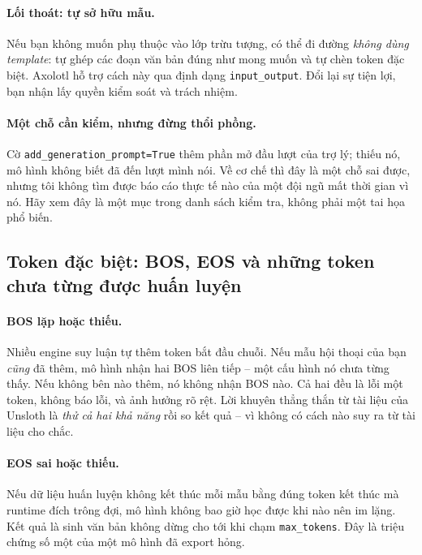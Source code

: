 \paragraph{Lối thoát: tự sở hữu mẫu.} Nếu bạn không muốn phụ thuộc vào lớp trừu tượng, có thể đi đường \emph{không dùng template}: tự ghép các đoạn văn bản đúng như mong muốn và tự chèn token đặc biệt. Axolotl hỗ trợ cách này qua định dạng \texttt{input\_output}. Đổi lại sự tiện lợi, bạn nhận lấy quyền kiểm soát và trách nhiệm.

\paragraph{Một chỗ cần kiểm, nhưng đừng thổi phồng.} Cờ \texttt{add\_\allowbreak generation\_\allowbreak prompt=True} thêm phần mở đầu lượt của trợ lý; thiếu nó, mô hình không biết đã đến lượt mình nói. Về cơ chế thì đây là một chỗ sai được, nhưng tôi không tìm được báo cáo thực tế nào của một đội ngũ mất thời gian vì nó. Hãy xem đây là một mục trong danh sách kiểm tra, không phải một tai họa phổ biến.

\subsection{Token đặc biệt: BOS, EOS và những token chưa từng được huấn luyện}
\label{ssec:special_tokens}

\paragraph{BOS lặp hoặc thiếu.} Nhiều engine suy luận tự thêm token bắt đầu chuỗi. Nếu mẫu hội thoại của bạn \emph{cũng} đã thêm, mô hình nhận hai BOS liên tiếp -- một cấu hình nó chưa từng thấy. Nếu không bên nào thêm, nó không nhận BOS nào. Cả hai đều là lỗi một token, không báo lỗi, và ảnh hưởng rõ rệt. Lời khuyên thẳng thắn từ tài liệu của Unsloth là \emph{thử cả hai khả năng} rồi so kết quả -- vì không có cách nào suy ra từ tài liệu cho chắc.

\paragraph{EOS sai hoặc thiếu.} Nếu dữ liệu huấn luyện không kết thúc mỗi mẫu bằng đúng token kết thúc mà runtime đích trông đợi, mô hình không bao giờ học được khi nào nên im lặng. Kết quả là sinh văn bản không dừng cho tới khi chạm \texttt{max\_tokens}. Đây là triệu chứng số một của một mô hình đã export hỏng.

